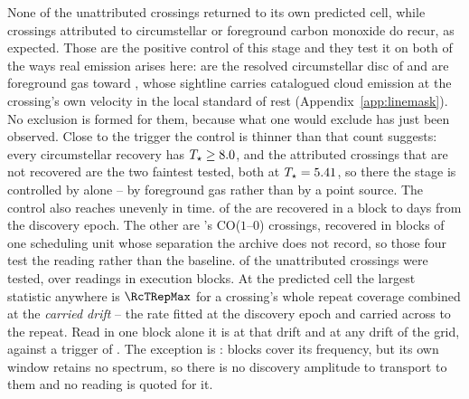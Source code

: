 None of the unattributed crossings returned to its own predicted cell, while
\MkAttrRecur{} crossings attributed to circumstellar or foreground carbon
monoxide do recur, as expected. Those \MkAttrRecur{} are the positive control of this stage and they
test it on both of the ways real emission arises here: \RqNRecurDisc{} are the
resolved circumstellar disc of \RqRecurDiscStars{} and \RqNRecurCloud{} are
foreground gas toward \RqRecurCloudStars, whose sightline carries catalogued
cloud emission at the crossing's own velocity in the local standard of rest
(Appendix~\ref{app:linemask}). No exclusion is formed for them, because what
one would exclude has just been observed. Close to the trigger the control is
thinner than that count suggests: every circumstellar recovery has
$T_\star\ge8.0$, and the \RqNearTrigN{} attributed crossings that
are not recovered are the two faintest tested, both at
$T_\star=5.41$, so there the stage is controlled by
\RqRecurCloudStars{} alone -- by foreground gas rather than by a point
source. The control also reaches unevenly in time. \PcNBeyondDay{} of the
\PcNCtl{} are recovered in a block \PcSepShownMinD{} to \PcSepMaxD{} days
from the discovery epoch. The other \PcNWithinDay{} are \PcWithinStar's
CO($1$--$0$) crossings, recovered in blocks of one scheduling unit whose
separation the archive does not record, so those four test the reading rather
than the baseline. \RcNExclPoss{} of the \RcNTested{} unattributed crossings were tested,
over \RcNRepeatMeas{} readings in \RcNRepeatBlock{} execution blocks. At the
predicted cell the largest statistic anywhere is $\RcTRepMax$ for a crossing's
whole repeat coverage combined at the \emph{carried drift} -- the rate fitted
at the discovery epoch and carried across to the repeat. Read in one block
alone it is \RcTMatched{} at that drift and \RcTMax{} at any drift of the
grid, against a trigger of \StageNullTrig. The exception is \RcUntStar{} \texttt{\RcUntEb}:
\RcUntNRep{} blocks cover its frequency, but its own window retains no
spectrum, so there is no discovery amplitude to transport to them and no
reading is quoted for it.

